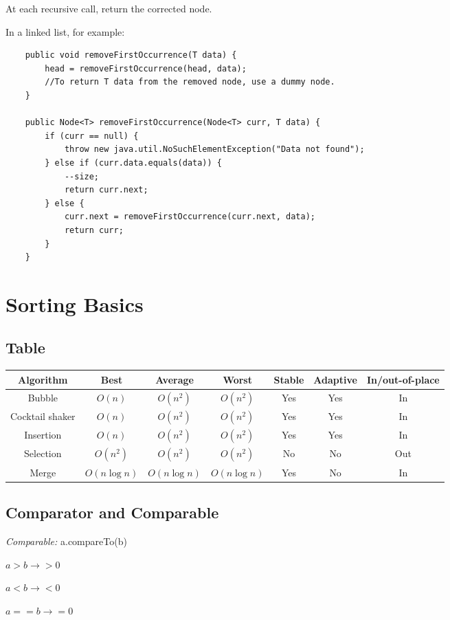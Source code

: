\documentclass[english,openany]{book}
\begin{document}
    At each recursive call, return the corrected node.

    In a linked list, for example:

    \begin{lstlisting}
    public void removeFirstOccurrence(T data) {
        head = removeFirstOccurrence(head, data);
        //To return T data from the removed node, use a dummy node.
    }

    public Node<T> removeFirstOccurrence(Node<T> curr, T data) {
        if (curr == null) {
            throw new java.util.NoSuchElementException("Data not found");
        } else if (curr.data.equals(data)) {
            --size;
            return curr.next;
        } else {
            curr.next = removeFirstOccurrence(curr.next, data);
            return curr;
        }
    }
    \end{lstlisting}


    \chapter{Sorting Basics}

    \section{Table}

    \begin{tabular}{c|cccccc}
        Algorithm&Best&Average&Worst&Stable&Adaptive&In/out-of-place\\
        \hline
        Bubble&$O(n)$&$O(n^2)$&$O(n^2)$&Yes&Yes&In\\
        Cocktail shaker&$O(n)$&$O(n^2)$&$O(n^2)$&Yes&Yes&In\\
        Insertion&$O(n)$&$O(n^2)$&$O(n^2)$&Yes&Yes&In\\
        Selection&$O(n^2)$&$O(n^2)$&$O(n^2)$&No&No&Out\\
        Merge&$O(n \log n)$&$O(n \log n)$&$O(n \log n)$&Yes&No&In
    \end{tabular}

    \section{Comparator and Comparable}

    \textit{Comparable:} a.compareTo(b)

    $a > b \rightarrow > 0$

    $a < b \rightarrow < 0$

    $a == b \rightarrow = 0$
\end{document}
